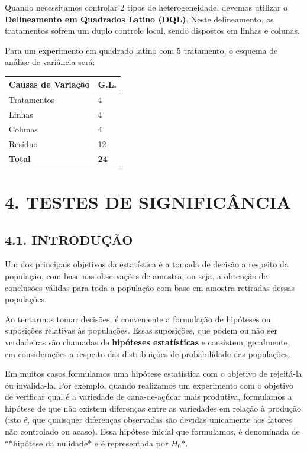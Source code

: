 \documentclass[
]{book}
\begin{document}
Quando necessitamos controlar 2 tipos de heterogeneidade, devemos utilizar o \textbf{Delineamento em Quadrados Latino (DQL)}. Neste delineamento, os tratamentos sofrem um duplo controle local, sendo dispostos em linhas e colunas.

Para um experimento em quadrado latino com 5 tratamento, o esquema de análise de variância será:

\begin{table}[H]
\centering
\begin{tabular}{l|l}
\hline
Causas de Variação & G.L.\\
\hline
Tratamentos & 4\\
\hline
Linhas & 4\\
\hline
Colunas & 4\\
\hline
Resíduo & 12\\
\hline
\textbf{Total} & \textbf{24}\\
\hline
\end{tabular}
\end{table}

\hypertarget{testes-de-significuxe2ncia}{%
\chapter{4. TESTES DE SIGNIFICÂNCIA}\label{testes-de-significuxe2ncia}}

\hypertarget{introduuxe7uxe3o-1}{%
\section{4.1. INTRODUÇÃO}\label{introduuxe7uxe3o-1}}

Um dos principais objetivos da estatística é a tomada de decisão a respeito da população, com base nas observações de amostra, ou seja, a obtenção de conclusões válidas para toda a população com base em amostra retiradas dessas populações.

Ao tentarmos tomar decisões, é conveniente a formulação de hipóteses ou suposições relativas às populações. Essas suposições, que podem ou não ser verdadeiras são chamadas de \textbf{hipóteses estatísticas} e consistem, geralmente, em considerações a respeito das distribuições de probabilidade das populações.

Em muitos casos formulamos uma hipótese estatística com o objetivo de rejeitá-la ou invalida-la. Por exemplo, quando realizamos um experimento com o objetivo de verificar qual é a variedade de cana-de-açúcar mais produtiva, formulamos a hipótese de que não existem diferenças entre as variedades em relação à produção (isto é, que quaisquer diferenças observadas são devidas unicamente aos fatores não controlado ou acaso). Essa hipótese inicial que formulamos, é denominada de **hipótese da nulidade* e é representada por \(H_0\)*.
\end{document}

